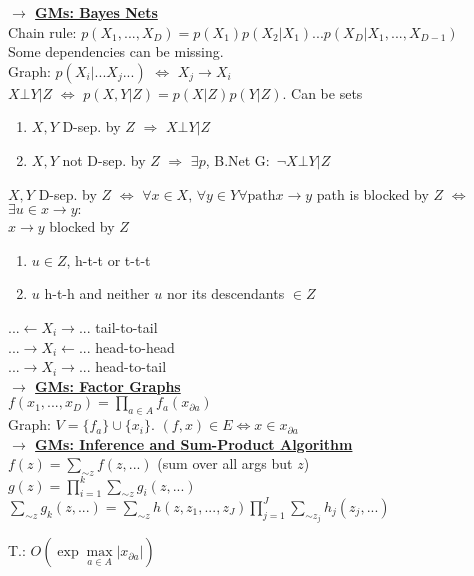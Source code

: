 \documentclass[11pt]{article}
\newcommand{\mytitle}[1]{ {\bf $\rightarrow$ \underline{#1}}\\}
\begin{document}
\begin{multicols*}{2}
\mytitle{GMs: Bayes Nets}
Chain rule: $p(X_1,...,X_D)=p(X_1)p(X_2|X_1)...p(X_D|X_1,...,X_{D-1})$\\
Some dependencies can be missing.\\
Graph: $p(X_i|...X_j...)$ $\Leftrightarrow$ $X_j\to X_i$\\
$X\bot Y|Z$ $\Leftrightarrow$ $p(X, Y|Z)=p(X|Z)p(Y|Z)$. Can be sets\\
\begin{enumerate}
	\item $X, Y$ D-sep. by $Z$ $\Rightarrow$ $X\bot Y|Z$
	\item $X, Y$ not D-sep. by $Z$ $\Rightarrow$ $\exists p$, B.Net G$\colon$ $\neg X\bot Y|Z$
\end{enumerate}
$X,Y$ D-sep. by $Z$ $\Leftrightarrow$ $\forall x\in X,\,\forall y\in Y \forall \mbox{path} x\to y$ path is blocked by $Z$ $\Leftrightarrow$ $\exists u\in x\to y\colon$\\
$x\to y$ blocked by $Z$
\begin{enumerate}
	\item $u\in Z$, h-t-t or t-t-t
	\item $u$ h-t-h and neither $u$ nor its descendants $\in Z$
\end{enumerate}
$...\leftarrow X_i\rightarrow...$ tail-to-tail\\
$...\rightarrow X_i\leftarrow...$ head-to-head\\
$...\rightarrow X_i\rightarrow...$ head-to-tail\\
\mytitle{GMs: Factor Graphs}
$f(x_1,...,x_D)=\prod\limits_{a\in A}f_a(x_{\partial a})$\\
Graph: $V=\{f_a\}\cup\{x_i\}$. $(f,x)\in E\Leftrightarrow x\in x_{\partial a}$\\

\mytitle{GMs: Inference and Sum-Product Algorithm}
$f(z)=\sum\limits_{\sim z}f(z,...)$ (sum over all args but $z$)\\
$g(z)=\prod\limits_{i=1}^k\sum\limits_{\sim z}g_i(z,...)$\\
$\sum\limits_{\sim z}g_k(z,...)=\sum\limits_{\sim z}h(z,z_1,...,z_J)\prod\limits_{j=1}^J\sum\limits_{\sim z_j}h_j(z_j,...)$

T.: $O\left(\exp \max\limits_{a\in A}|x_{\partial a}|\right)$
\end{multicols*}
\end{document}
